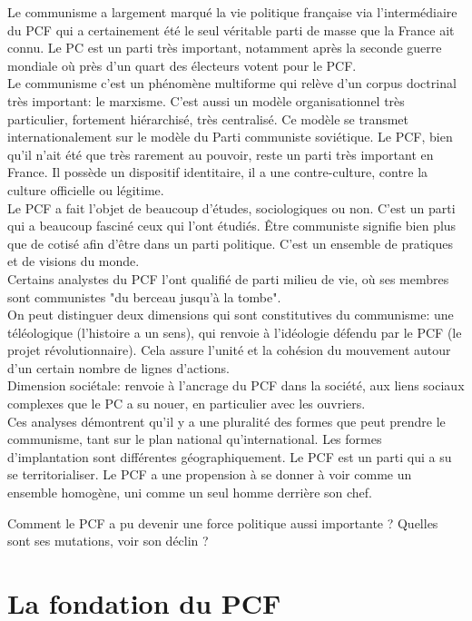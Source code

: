 \documentclass[10pt, a4paper, openany]{book}
\begin{document}
Le communisme a largement marqué la vie politique française via l'intermédiaire du PCF qui a certainement été le seul véritable parti de masse que la France ait connu. Le PC est un parti très important, notamment après la seconde guerre mondiale où près d'un quart des électeurs votent pour le PCF. \\
Le communisme c'est un phénomène multiforme qui relève d'un corpus doctrinal très important: le marxisme. C'est aussi un modèle organisationnel très particulier, fortement hiérarchisé, très centralisé. Ce modèle se transmet internationalement sur le modèle du Parti communiste soviétique. Le PCF, bien qu'il n'ait été que très rarement au pouvoir, reste un parti très important en France. Il possède un dispositif identitaire, il a une contre-culture, contre la culture officielle ou légitime. \\
Le PCF a fait l'objet de beaucoup d'études, sociologiques ou non. C'est un parti qui a beaucoup fasciné ceux qui l'ont étudiés. Être communiste signifie bien plus que de cotisé afin d'être dans un parti politique. C'est un ensemble de pratiques et de visions du monde. \\
Certains analystes du PCF l'ont qualifié de parti milieu de vie, où ses membres sont communistes "du berceau jusqu'à la tombe". \\
On peut distinguer deux dimensions qui sont constitutives du communisme: une téléologique (l'histoire a un sens), qui renvoie à l'idéologie défendu par le PCF (le projet révolutionnaire). Cela assure l'unité et la cohésion du mouvement autour d'un certain nombre de lignes d'actions. \\
Dimension sociétale: renvoie à l'ancrage du PCF dans la société, aux liens sociaux complexes que le PC a su nouer, en particulier avec les ouvriers. \\
Ces analyses démontrent qu'il y a une pluralité des formes que peut prendre le communisme, tant sur le plan national qu'international. Les formes d'implantation sont différentes géographiquement. Le PCF est un parti qui a su se territorialiser. Le PCF a une propension à se donner à voir comme un ensemble homogène, uni comme un seul homme derrière son chef. 


Comment le PCF a pu devenir une force politique aussi importante ? Quelles sont ses mutations, voir son déclin ?

\section{La fondation du PCF}
\end{document}
